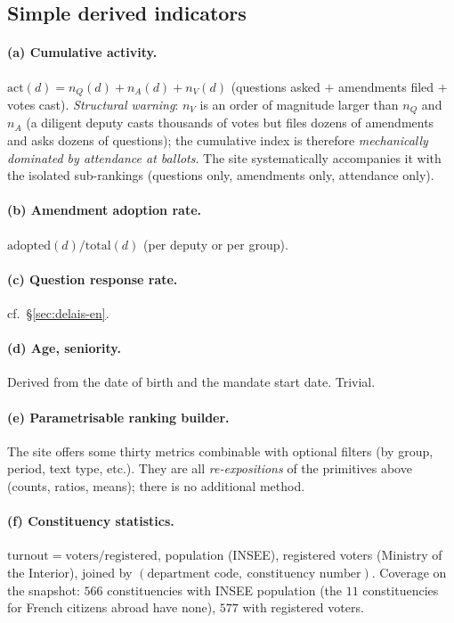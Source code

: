 \subsection{Simple derived indicators}\label{sec:simples-en}

\paragraph{(a) Cumulative activity.} $\mathrm{act}(d)=n_Q(d)+n_A(d)+n_V(d)$
(questions asked $+$ amendments filed $+$ votes cast). \emph{Structural warning}:
$n_V$ is an order of magnitude larger than $n_Q$ and $n_A$ (a diligent deputy casts
thousands of votes but files dozens of amendments and asks dozens of questions); the
cumulative index is therefore \emph{mechanically dominated by attendance at
ballots}. The site systematically accompanies it with the isolated sub-rankings
(questions only, amendments only, attendance only).

\paragraph{(b) Amendment adoption rate.} $\mathrm{adopted}(d)/\mathrm{total}(d)$
(per deputy or per group).

\paragraph{(c) Question response rate.} cf.~§\ref{sec:delais-en}.

\paragraph{(d) Age, seniority.} Derived from the date of birth and the mandate
start date. Trivial.

\paragraph{(e) Parametrisable ranking builder.} The site offers some thirty
\og{}metrics\fg{} combinable with optional filters (by group, period, text type,
etc.). They are all \emph{re-expositions} of the primitives above (counts, ratios,
means); there is no additional method.

\paragraph{(f) Constituency statistics.} $\mathrm{turnout}=\mathrm{voters}/\mathrm{registered}$,
population (INSEE), registered voters (Ministry of the Interior), joined by
$(\text{department code},\ \text{constituency number})$. Coverage on the snapshot:
$566$ constituencies with INSEE population (the $11$ constituencies for French
citizens abroad have none), $577$ with registered voters.

